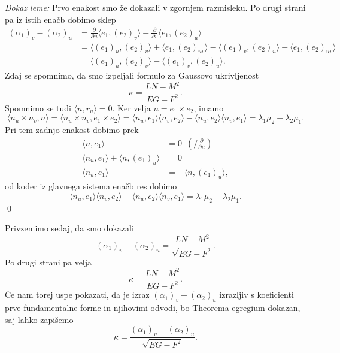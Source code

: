 \noindent
{\em Dokaz leme:\/}
Prvo enakost smo že dokazali v zgornjem razmisleku. Po drugi strani pa iz istih enačb dobimo sklep \begin{align*}
    (\alpha_1)_v - (\alpha_2)_u &= \frac{ \partial  }{ \partial u }  \langle e_1, (e_2)_v \rangle - \frac{ \partial  }{ \partial v}  \langle e_1, (e_2)_u \rangle \\
     &= \langle  (e_1)_u, (e_2)_v \rangle + \langle  e_1, (e_2)_{uv} \rangle  - \langle  (e_1)_v, (e_2)_u \rangle - \langle  e_1, (e_2)_{uv} \rangle \\
     &= \langle  (e_1)_u, (e_2)_v \rangle - \langle  (e_1)_v, (e_2)_u \rangle.
\end{align*}
Zdaj se spomnimo, da smo izpeljali formulo za Gaussovo ukrivljenost \begin{equation*}
\kappa = \frac{LN - M^2}{EG - F^2}.
\end{equation*}  
Spomnimo se tudi $\langle n, r_u \rangle = 0$. Ker velja $n = e_1 \times  e_2$, imamo \begin{equation*}
\langle n_u \times n_v, n \rangle = \langle n_u \times  n_v, e_1 \times e_2 \rangle = \langle n_u, e_1 \rangle \langle n_v, e_2 \rangle - \langle n_u, e_2 \rangle \langle n_v, e_1 \rangle = \lambda_1 \mu_2 - \lambda_2 \mu_1. 
\end{equation*}  
Pri tem zadnjo enakost dobimo prek \begin{align*}
     \langle n, e_1 \rangle &= 0 \,\,\,(\bigg/ \frac{ \partial  }{ \partial u }) \\
     \langle n_u, e_1 \rangle + \langle  n, (e_1)_u \rangle  &= 0 \\
     \langle n_u, e_1 \rangle &= - \langle n, (e_1)_u \rangle,  
\end{align*}
od koder iz glavnega sistema enačb res dobimo %
\begin{equation*}
    \langle n_u, e_1 \rangle \langle n_v, e_2 \rangle - \langle n_u, e_2 \rangle \langle n_v, e_1 \rangle = \lambda_1 \mu_2 - \lambda_2 \mu_1.
\end{equation*}  
\qed

Privzemimo sedaj, da smo dokazali \begin{equation*}
(\alpha_1)_v - (\alpha_2)_u = \frac{LN - M^2}{\sqrt{EG - F^2}}.  
\end{equation*}  
 Po drugi strani pa velja \begin{equation*}
    \kappa = \frac{LN - M^2}{EG - F^2}.
 \end{equation*}  
Če nam torej uspe pokazati, da je izraz $(\alpha_1)_v - (\alpha_2)_u$ izrazljiv s koeficienti prve fundamentalne forme in njihovimi odvodi, bo Theorema egregium dokazan, saj lahko zapišemo \begin{equation*}
\kappa = \frac{(\alpha_1)_v - (\alpha_2)_u}{\sqrt{EG - F^2}}.
\end{equation*}  

